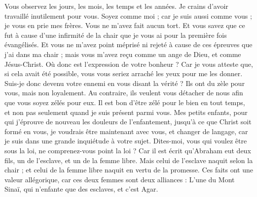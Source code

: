 \begin{multicols}{2}
Vous observez les jours, les mois, les temps et les années.
Je crains d’avoir travaillé inutilement pour vous.
Soyez comme moi ; car je suis aussi comme vous ; je vous en prie mes frères.
Vous ne m'avez fait aucun tort. Et vous savez que ce fut à cause d’une infirmité de la chair que je vous ai pour la première fois évangélisés.
Et vous ne m’avez point méprisé ni rejeté à cause de ces épreuves que j’ai dans ma chair ; mais vous m'avez reçu comme un ange de Dieu, et comme Jésus-Christ.
Où donc est l’expression de votre bonheur ? Car je vous atteste que, si cela avait été possible, vous vous seriez arraché les yeux pour me les donner.
Suis-je donc devenu votre ennemi en vous disant la vérité ?
Ils ont du zèle pour vous, mais non loyalement. Au contraire, ils veulent vous détacher de nous afin que vous soyez zélés pour eux.
Il est bon d'être zélé pour le bien en tout temps, et non pas seulement quand je suis présent parmi vous.
Mes petits enfants, pour qui j’éprouve de nouveau les douleurs de l’enfantement, jusqu'à ce que Christ soit formé en vous,
je voudrais être maintenant avec vous, et changer de langage, car je suis dans une grande inquiétude à votre sujet.
Dites-moi, vous qui voulez être sous la loi, ne comprenez-vous point la loi ?
Car il est écrit qu'Abraham eut deux fils, un de l’esclave, et un de la femme libre.
Mais celui de l’esclave naquit selon la chair ; et celui de la femme libre naquit en vertu de la promesse.
Ces faits ont une valeur allégorique, car ces deux femmes sont deux alliances : L'une du Mont Sinaï, qui n’enfante que des esclaves, et c'est Agar.

\end{multicols}
